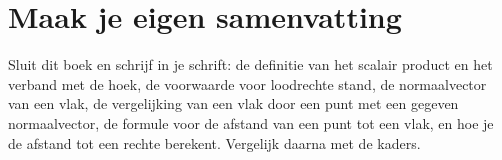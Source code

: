 
\begin{oefeningen}






\end{oefeningen}


\ifzelfstudie
\section*{Maak je eigen samenvatting}
Sluit dit boek en schrijf in je schrift: de definitie van het scalair product en het verband met de hoek, de voorwaarde voor loodrechte stand, de normaalvector van een vlak, de vergelijking van een vlak door een punt met een gegeven normaalvector, de formule voor de afstand van een punt tot een vlak, en hoe je de afstand tot een rechte berekent. Vergelijk daarna met de kaders.
\fi
